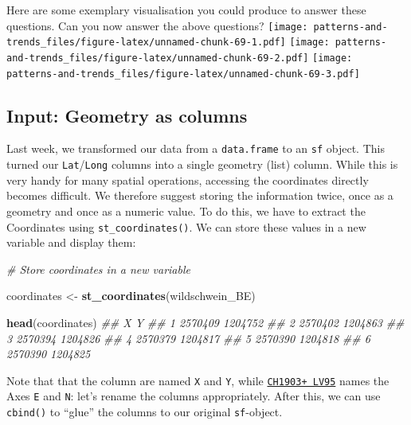\documentclass[]{book}
\newenvironment{Shaded}{\begin{snugshade}}{\end{snugshade}}
\newcommand{\CommentTok}[1]{\textcolor[rgb]{0.56,0.35,0.01}{\textit{#1}}}
\newcommand{\KeywordTok}[1]{\textcolor[rgb]{0.13,0.29,0.53}{\textbf{#1}}}
\newcommand{\NormalTok}[1]{#1}
\newcommand{\StringTok}[1]{\textcolor[rgb]{0.31,0.60,0.02}{#1}}
\begin{document}
Here are some exemplary visualisation you could produce to answer these questions. Can you now answer the above questions?
\texttt{[image: patterns-and-trends\_files/figure-latex/unnamed-chunk-69-1.pdf]} \texttt{[image: patterns-and-trends\_files/figure-latex/unnamed-chunk-69-2.pdf]} \texttt{[image: patterns-and-trends\_files/figure-latex/unnamed-chunk-69-3.pdf]}

\hypertarget{input-geometry-as-columns}{%
\subsection{Input: Geometry as columns}\label{input-geometry-as-columns}}

Last week, we transformed our data from a \texttt{data.frame} to an \texttt{sf} object. This turned our \texttt{Lat}/\texttt{Long} columns into a single geometry (list) column. While this is very handy for many spatial operations, accessing the coordinates directly becomes difficult. We therefore suggest storing the information twice, once as a geometry and once as a numeric value. To do this, we have to extract the Coordinates using \texttt{st\_coordinates()}. We can store these values in a new variable and display them:

\begin{Shaded}
\begin{Highlighting}[]
\CommentTok{# Store coordinates in a new variable}

\NormalTok{coordinates <-}\StringTok{ }\KeywordTok{st_coordinates}\NormalTok{(wildschwein_BE)}

\KeywordTok{head}\NormalTok{(coordinates)}
\CommentTok{##         X       Y}
\CommentTok{## 1 2570409 1204752}
\CommentTok{## 2 2570402 1204863}
\CommentTok{## 3 2570394 1204826}
\CommentTok{## 4 2570379 1204817}
\CommentTok{## 5 2570390 1204818}
\CommentTok{## 6 2570390 1204825}
\end{Highlighting}
\end{Shaded}

Note that that the column are named \texttt{X} and \texttt{Y}, while \href{https://www.swisstopo.admin.ch/de/wissen-fakten/geodaesie-vermessung/neue-koordinaten.html}{\texttt{CH1903+\ LV95}} names the Axes \texttt{E} and \texttt{N}: let's rename the columns appropriately. After this, we can use \texttt{cbind()} to ``glue'' the columns to our original \texttt{sf}-object.
\end{document}
